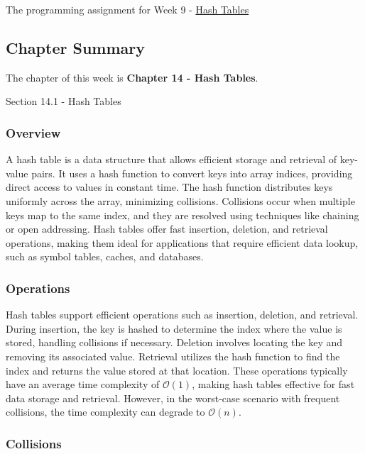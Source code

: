 The programming assignment for Week 9 - \href{https://github.com/QuantumCompiler/CU/tree/main/CSPB%202270%20-%20Data%20Structures/CSPB%202270%20-%20Programming%20Assignments/CSPB%202270%20-%20Assignment%207%20-%20Hash%20Table}{Hash Tables}

\subsection{Chapter Summary}

The chapter of this week is \textbf{Chapter 14 - Hash Tables}.

\begin{notes}{Section 14.1 - Hash Tables}
    \subsubsection*{Overview}

    A hash table is a data structure that allows efficient storage and retrieval of key-value pairs. It uses a hash function to convert keys into array indices, providing direct access to values in constant 
    time. The hash function distributes keys uniformly across the array, minimizing collisions. Collisions occur when multiple keys map to the same index, and they are resolved using techniques like chaining 
    or open addressing. Hash tables offer fast insertion, deletion, and retrieval operations, making them ideal for applications that require efficient data lookup, such as symbol tables, caches, and databases.
    
    \subsubsection*{Operations}
    
    Hash tables support efficient operations such as insertion, deletion, and retrieval. During insertion, the key is hashed to determine the index where the value is stored, handling collisions if necessary. 
    Deletion involves locating the key and removing its associated value. Retrieval utilizes the hash function to find the index and returns the value stored at that location. These operations typically have an 
    average time complexity of $\mathcal{O}(1)$, making hash tables effective for fast data storage and retrieval. However, in the worst-case scenario with frequent collisions, the time complexity can degrade to 
    $\mathcal{O}(n)$.
    
    \subsubsection*{Collisions}
    

\end{notes}
